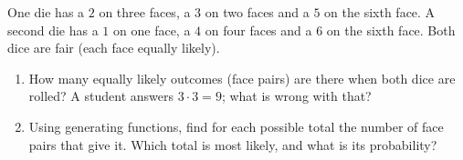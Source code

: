 One die has a $2$ on three faces, a $3$ on two faces and a $5$ on the sixth face. A second die has a $1$ on one face, a $4$ on four faces and a $6$ on the sixth face. Both dice are fair (each face equally likely).
\begin{enumerate}
\item[(a)] How many equally likely outcomes (face pairs) are there when both dice are rolled? A student answers $3\cdot3=9$; what is wrong with that?
\item[(b)] Using generating functions, find for each possible total the number of face pairs that give it. Which total is most likely, and what is its probability?
\end{enumerate}
